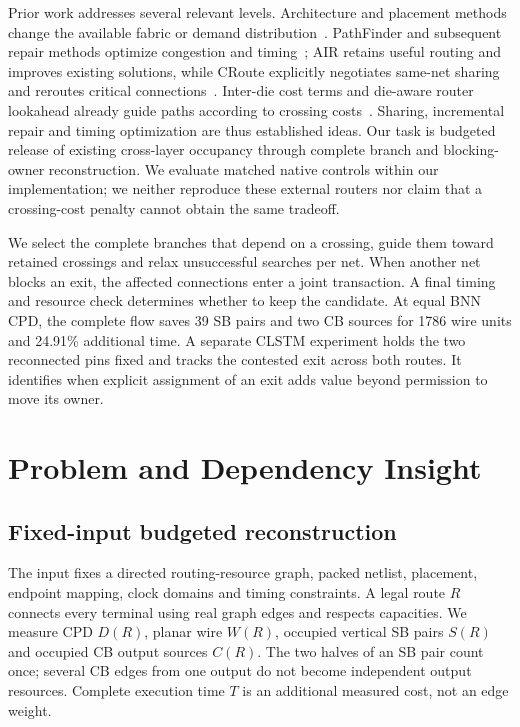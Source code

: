 \documentclass[conference,10pt]{IEEEtran}
\begin{document}
Prior work addresses several relevant levels. Architecture and placement methods change the available fabric or demand distribution~\cite{lazagna,flatland}. PathFinder and subsequent repair methods optimize congestion and timing~\cite{pathfinder,liurepair}; AIR retains useful routing and improves existing solutions, while CRoute explicitly negotiates same-net sharing and reroutes critical connections~\cite{air,croute}. Inter-die cost terms and die-aware router lookahead already guide paths according to crossing costs~\cite{nasiri,multidie}. Sharing, incremental repair and timing optimization are thus established ideas. Our task is budgeted release of existing cross-layer occupancy through complete branch and blocking-owner reconstruction. We evaluate matched native controls within our implementation; we neither reproduce these external routers nor claim that a crossing-cost penalty cannot obtain the same tradeoff.

We select the complete branches that depend on a crossing, guide them toward retained crossings and relax unsuccessful searches per net. When another net blocks an exit, the affected connections enter a joint transaction. A final timing and resource check determines whether to keep the candidate. At equal BNN CPD, the complete flow saves 39 SB pairs and two CB sources for 1786 wire units and 24.91\% additional time. A separate CLSTM experiment holds the two reconnected pins fixed and tracks the contested exit across both routes. It identifies when explicit assignment of an exit adds value beyond permission to move its owner.

\section{Problem and Dependency Insight}
\subsection{Fixed-input budgeted reconstruction}
The input fixes a directed routing-resource graph, packed netlist, placement, endpoint mapping, clock domains and timing constraints. A legal route $R$ connects every terminal using real graph edges and respects capacities. We measure CPD $D(R)$, planar wire $W(R)$, occupied vertical SB pairs $S(R)$ and occupied CB output sources $C(R)$. The two halves of an SB pair count once; several CB edges from one output do not become independent output resources. Complete execution time $T$ is an additional measured cost, not an edge weight.
\end{document}
